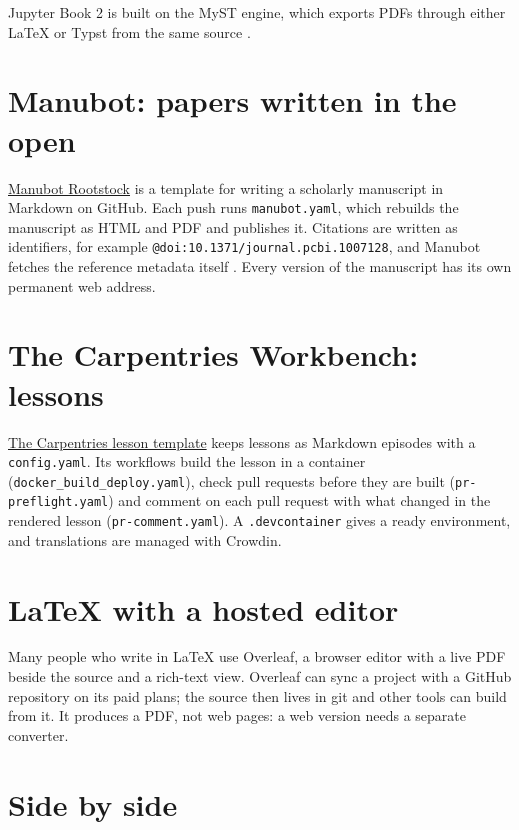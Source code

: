 Jupyter Book 2 is built on the MyST engine, which exports PDFs through either LaTeX or Typst from the same source \citep{mystpdf}.

\section{Manubot: papers written in the open}

\href{https://github.com/manubot/rootstock}{Manubot Rootstock} is a template for writing a scholarly manuscript in Markdown on GitHub. Each push runs \texttt{manubot.yaml}, which rebuilds the manuscript as HTML and PDF and publishes it. Citations are written as identifiers, for example \texttt{@doi:10.1371/journal.pcbi.1007128}, and Manubot fetches the reference metadata itself \citep{himmelstein2019}. Every version of the manuscript has its own permanent web address.

\section{The Carpentries Workbench: lessons}

\href{https://github.com/carpentries/workbench-template-md}{The Carpentries lesson template} keeps lessons as Markdown episodes with a \texttt{config.yaml}. Its workflows build the lesson in a container (\texttt{docker\_build\_deploy.yaml}), check pull requests before they are built (\texttt{pr-preflight.yaml}) and comment on each pull request with what changed in the rendered lesson (\texttt{pr-comment.yaml}). A \texttt{.devcontainer} gives a ready environment, and translations are managed with Crowdin.

\section{LaTeX with a hosted editor}

Many people who write in LaTeX use Overleaf, a browser editor with a live PDF beside the source and a rich-text view. Overleaf can sync a project with a GitHub repository on its paid plans; the source then lives in git and other tools can build from it. It produces a PDF, not web pages: a web version needs a separate converter.

\section{Side by side}


